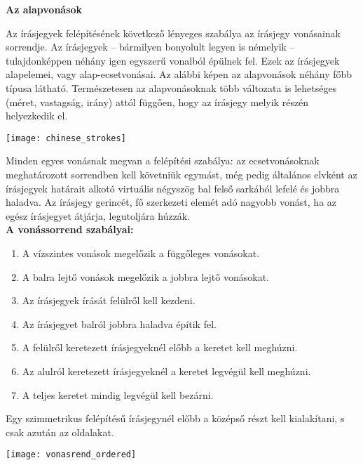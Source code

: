 
{\large \textbf{Az alapvonások}}

Az írásjegyek felépítésének következő lényeges szabálya az írásjegy vonásainak sorrendje. Az írásjegyek – bármilyen bonyolult legyen is némelyik – tulajdonképpen néhány igen egyszerű vonalból épülnek fel. Ezek az írásjegyek alapelemei, vagy alap-ecsetvonásai. Az alábbi képen az alapvonások néhány főbb típusa látható. Természetesen az alapvonásoknak több változata is lehetséges (méret, vastagság, irány) attól függően, hogy az írásjegy melyik részén helyezkedik el.\\

\begin{center}
	\texttt{[image: chinese\_strokes]}
\end{center}

Minden egyes vonásnak megvan a felépítési szabálya: az ecsetvonásoknak meghatározott sorrendben kell követniük egymást, még pedig általános elvként az írásjegyek határait alkotó virtuális négyszög bal felső sarkából lefelé és jobbra haladva. Az írásjegy gerincét, fő szerkezeti elemét adó nagyobb vonást, ha az egész írásjegyet átjárja, legutoljára húzzák.\\

\newpage
{\large \textbf{A vonássorrend szabályai: }}
\begin{enumerate}
	\item A vízszintes vonások megelőzik a függőleges vonásokat.
	\item A balra lejtő vonások megelőzik a jobbra lejtő vonásokat. 
	\item Az írásjegyek írását felülről kell kezdeni. 
	\item Az írásjegyet balról jobbra haladva építik fel. 
	\item A felülről keretezett írásjegyeknél előbb a keretet kell meghúzni. 
	\item Az alulról keretezett írásjegyeknél a keretet legvégül kell meghúzni. 
	\item A teljes keretet mindig legvégül kell bezárni.
\end{enumerate}

Egy szimmetrikus felépítésű írásjegynél előbb a középső részt kell kialakítani, s csak azután az oldalakat.\\

\begin{center}
	\texttt{[image: vonasrend\_ordered]}
\end{center}

